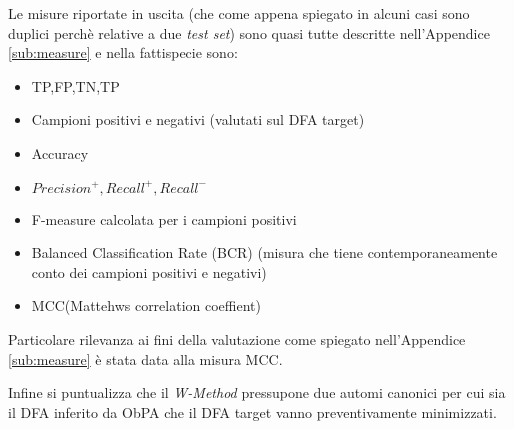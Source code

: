 Le misure riportate in uscita (che come appena spiegato in alcuni casi sono duplici perchè relative a due \textit{test set}) sono quasi tutte descritte nell'Appendice \ref{sub:measure} e nella fattispecie sono:
\begin{itemize}
\item TP,FP,TN,TP
\item Campioni positivi e negativi (valutati sul \ac{DFA} target)
\item Accuracy
\item $Precision^{+},Recall^{+},Recall^{-}$
\item F-measure calcolata per i campioni positivi
\item Balanced Classification Rate (BCR) (misura che tiene contemporaneamente conto dei campioni positivi e negativi)
\item MCC(Mattehws correlation coeffient)
\end{itemize}        
Particolare rilevanza ai fini della valutazione come spiegato nell'Appendice \ref{sub:measure} è stata data  alla misura MCC.

Infine si puntualizza che il \textit{W-Method} pressupone due automi canonici per cui sia il \ac{DFA} inferito da \ac{ObPA} che il \ac{DFA} target vanno preventivamente minimizzati.
	  
